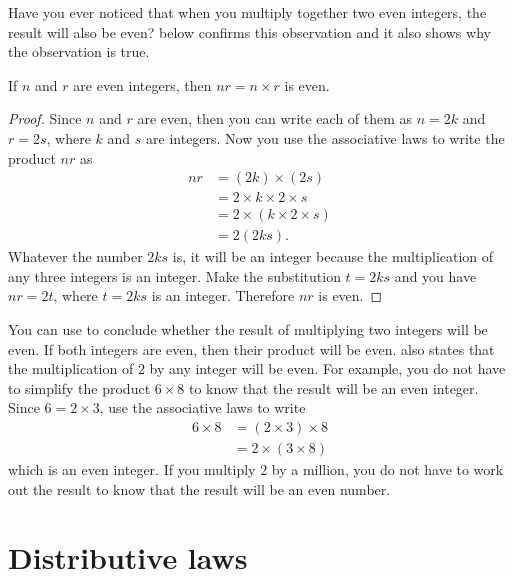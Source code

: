 \documentclass[a4paper,oneside,12pt]{article}
\begin{document}
Have you ever noticed that when you multiply together two even
integers, the result will also be even?
 below confirms this
observation and it also shows why the observation is true.

\begin{theorem}
\label{thm:product_of_two_evens_is_even}
If $n$ and $r$ are even integers, then $nr = n \times r$ is even.
\end{theorem}

\begin{proof}
Since $n$ and $r$ are even, then you can write each of them as
$n = 2k$ and $r = 2s$, where $k$ and $s$ are integers.  Now you use
the associative laws to write the product $nr$ as
\begin{align*}
nr
&=
(2k) \times (2s) \\[4pt]
&=
2 \times k \times 2 \times s \\[4pt]
&=
2 \times (k \times 2 \times s) \\[4pt]
&=
2 (2ks).
\end{align*}
Whatever the number $2ks$ is, it will be an integer because the
multiplication of any three integers is an integer.  Make the
substitution $t = 2ks$ and you have $nr = 2t$, where $t = 2ks$ is an
integer.  Therefore $nr$ is even.
\end{proof}

You can use  to conclude
whether the result of multiplying two integers will be even.  If both
integers are even, then their product will be even.
 also states that the
multiplication of $2$ by any integer will be even. For example, you
do not have to simplify the product $6 \times 8$ to know that the
result will be an even integer.  Since $6 = 2 \times 3$, use the
associative laws to write
\begin{align*}
6 \times 8
&= (2 \times 3) \times 8 \\[4pt]
&=
2 \times (3 \times 8)
\end{align*}
which is an even integer.  If you multiply $2$ by a million, you do
not have to work out the result to know that the result will be an
even number.



\section{Distributive laws}
\end{document}
